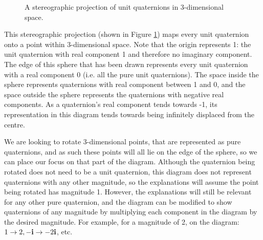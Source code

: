 \documentclass[10pt]{article}
\begin{document}
\begin{figure}[ht]
    \centering
    \caption{A stereographic projection of unit quaternions in 3-dimensional space. \cite{Penguin}}
    \label{StereographicFig}
\end{figure}

This stereographic projection (shown in Figure \ref{StereographicFig}) maps every unit quaternion onto a point within 3-dimensional space. Note that the origin represents 1: the unit quaternion with real component 1 and therefore no imaginary component. The edge of this sphere that has been drawn represents every unit quaternion with a real component 0 (i.e. all the pure unit quaternions). The space inside the sphere represents quaternions with real component between 1 and 0, and the space outside the sphere represents the quaternions with negative real components. As a quaternion's real component tends towards -1, its representation in this diagram tends towards being infinitely displaced from the centre.

We are looking to rotate 3-dimensional points, that are represented as pure quaternions, and as such these points will all lie on the edge of the sphere, so we can place our focus on that part of the diagram. Although the quaternion being rotated does not need to be a unit quaternion, this diagram does not represent quaternions with any other magnitude, so the explanations will assume the point being rotated has magnitude 1. However, the explanations will still be relevant for any other pure quaternion, and the diagram can be modified to show quaternions of any magnitude by multiplying each component in the diagram by the desired magnitude. For example, for a magnitude of 2, on the diagram: $1 \rightarrow 2, -\vb{i} \rightarrow -2\vb{i}$, etc.
\end{document}
